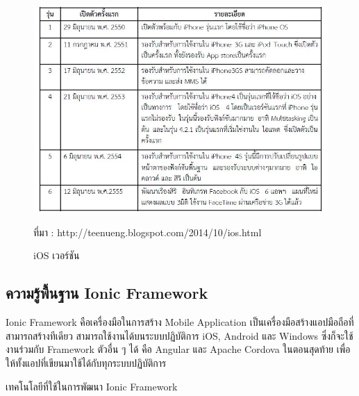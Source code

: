 	\begin{figure}[H]
			\centering
			\includegraphics[width=1.0\columnwidth]{Figures/2/iosversion}
			\caption{iOS เวอร์ชัน}{ที่มา : http://teenueng.blogspot.com/2014/10/ios.html}
			\label{Fig:iosversion}
		\end{figure}

	 \subsection{ความรู้พื้นฐาน Ionic Framework}
	 Ionic Framework คือเครื่องมือในการสร้าง Mobile Application เป็นเครื่องมือสร้างแอปมือถือที่สามารถสร้างทีเดียว สามารถใช้งานได้บนระบบปฏิบัติการ 
	 iOS, Android และ Windows ซึ่งก็จะใช้งานร่วมกับ Framework ตัวอื่น ๆ ได้ คือ Angular และ Apache Cordova 
	 ในตอนสุดท้าย เพื่อให้ทั้งแอปที่เขียนมาใช้ได้กับทุกระบบปฏิบัติการ

		เทคโนโลยีที่ใช้ในการพัฒนา Ionic Framework

